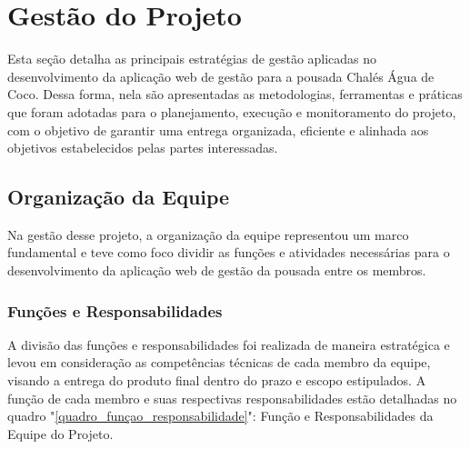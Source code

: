 \documentclass[
	12pt,				%
	openany,			%
	twoside,			%
	a4paper,			%
	english,			%
	french,				%
	spanish,			%
	brazil				%
	]{abntex2}
\begin{document}

\chapter{Gestão do Projeto}
Esta seção detalha as principais estratégias de gestão aplicadas no desenvolvimento da aplicação web de gestão para a pousada Chalés Água de Coco. Dessa forma, nela são apresentadas as metodologias, ferramentas e práticas que foram adotadas para o planejamento, execução e monitoramento do projeto, com o objetivo de garantir uma entrega organizada, eficiente e alinhada aos objetivos estabelecidos pelas partes interessadas.
\section{Organização da Equipe}
  Na gestão desse projeto, a organização da equipe representou um marco fundamental e teve como foco dividir as funções e atividades necessárias para o desenvolvimento da aplicação web de gestão da pousada entre os membros.
  
\subsection{Funções e Responsabilidades}
A divisão das funções e responsabilidades foi realizada de maneira estratégica e levou em consideração as competências técnicas de cada membro da equipe, visando a entrega do produto final dentro do prazo e escopo estipulados. 	A função de cada membro e suas respectivas responsabilidades estão detalhadas no quadro "\ref{quadro_funçao_responsabilidade}": Função e Responsabilidades da Equipe do Projeto.	
\end{document}
